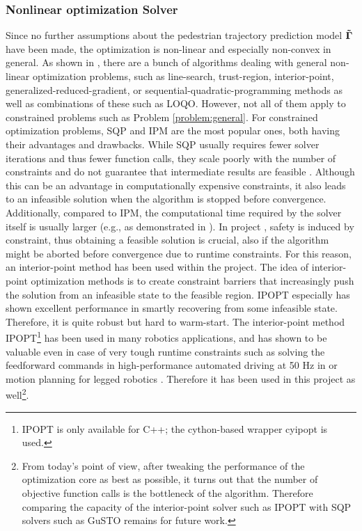 \subsubsection{Nonlinear optimization Solver} 
Since no further assumptions about the pedestrian trajectory prediction model $\distmodel[]$ have been made, the optimization is non-linear and especially non-convex in general. As shown in \cite{Gould2003}\cite{Parkinson2018}\cite{Freund2004}, there are a bunch of algorithms dealing with general non-linear optimization problems, such as line-search, trust-region, interior-point, generalized-reduced-gradient, or sequential-quadratic-programming methods as well as combinations of these such as LOQO. However, not all of them apply to constrained problems such as Problem \ref{problem:general}. For constrained optimization problems, \ac{SQP} and \ac{IPM} are the most popular ones, both having their advantages and drawbacks. While \ac{SQP} usually requires fewer solver iterations and thus fewer function calls, they scale poorly with the number of constraints and do not guarantee that intermediate results are feasible \cite{Dehdari2013}\cite{Parkinson2018}. Although this can be an advantage in computationally expensive constraints, it also leads to an infeasible solution when the algorithm is stopped before convergence. Additionally, compared to \ac{IPM}, the computational time required by the solver itself is usually larger (e.g., as demonstrated in \cite{Dehdari2013}).
\newline
In project \project, safety is induced by constraint, thus obtaining a feasible solution is crucial, also if the algorithm might be aborted before convergence due to runtime constraints. For this reason, an interior-point method has been used within the project. The idea of interior-point optimization methods is to create constraint barriers that increasingly push the solution from an infeasible state to the feasible region. IPOPT especially has shown excellent performance in smartly recovering from some infeasible state.  Therefore, it is quite robust but hard to warm-start. 
\newline
The interior-point method \ac{IPOPT}\footnote{\ac{IPOPT} is only available for C++; the cython-based wrapper cyipopt is used.} \cite{Wachter2006} has been used in many robotics applications, and has shown to be valuable even in case of very tough runtime constraints such as solving the feedforward commands in high-performance automated driving at 50 Hz in \cite{Spielberge2019} or motion planning for legged robotics \cite{Winkler2018}. Therefore it has been used in this project as well\footnote{From today's point of view, after tweaking the performance of the optimization core as best as possible, it turns out that the number of objective function calls is the bottleneck of the algorithm. Therefore comparing the capacity of the interior-point solver such as \ac{IPOPT} with \ac{SQP} solvers such as \ac{GuSTO} remains for future work.}.

